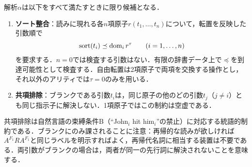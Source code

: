 \documentclass[../../main-detail.tex]{subfiles}
\begin{document}
\begin{definition}[ハードフィルタ]
    解析$\alpha$は以下をすべて満たすときに限り候補となる．
    \begin{enumerate}[label=(H\arabic*)]
        \item \textbf{ソート整合}：読みに現れる各$n$項原子$r(t_1,\ldots,t_n)$について，転置を反映した引数順で
        \[
            \mathrm{sort}(t_i)\preceq\mathop{\mathrm{dom}}\nolimits_i r^\tau\qquad(i=1,\ldots,n)
        \]
        を要求する．$n=0$では検査する引数はない．有限の辞書データ上で$\preceq$を到達可能性として検査する．自由転置は2項原子で両項を交換する操作とし，それ以外のアリティでは$\tau=0$のみを用いる．
        \item \textbf{共項排除}：ブランクである引数$t_i$は，同じ原子の他のどの引数$t_j$（$j\ne i$）とも同じ指示子に解決しない．1項原子ではこの制約は空虚である．
    \end{enumerate}
\end{definition}
\begin{remark}
    共項排除は自然言語の束縛条件B（``John$_i$ hit him$_i$''の禁止）に対応する統語的制約である．ブランクにのみ課されることに注意：再帰的な読みが欲しければ$A^{F_1}RA^{F_1}$と同じラベルを明示すればよく，再帰代名詞に相当する装置は不要である．両引数がブランクの場合は，両者が同一の先行詞に解決されないことを意味する．
\end{remark}
\end{document}

